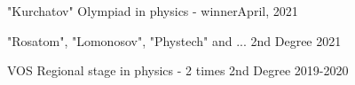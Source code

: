 "Kurchatov" Olympiad in physics - winner\hfill April, 2021 \par
"Rosatom", "Lomonosov", "Phystech" and ... 2nd Degree \hfill 2021\par
VOS Regional stage in physics - 2 times 2nd Degree \hfill 2019-2020\par
 